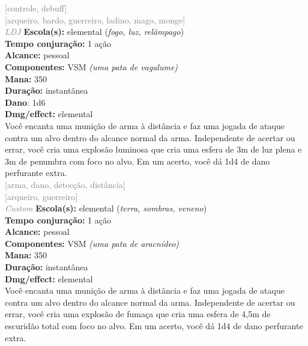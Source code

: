 \documentclass{RPG_Adventure}[2021/10/20]
\begin{document}
{\scriptsize \textcolor{gray}{[controle, debuff]\\}}
{\scriptsize \textcolor{gray}{[arqueiro, bardo, guerreiro, ladino, mago, monge]\\}}
{\tiny \textcolor{gray}{\textit{LDJ}}}
{\small \t \textbf{Escola(s):} elemental (\textit{fogo, luz, relâmpago})\\\t \textbf{Tempo conjuração:} 1 ação\\\t \textbf{Alcance:} pessoal\\\t \textbf{Componentes:} VSM \textit{(uma pata de vagalume)}\\\t \textbf{Mana:} 350\\\t \textbf{Duração:} instantânea\\\t \textbf{Dano}: 1d6\\\t \textbf{Dmg/effect:} elemental\\}
{\normalsize Você encanta uma munição de arma à distância e faz uma jogada de ataque contra um alvo dentro do alcance normal da arma. Independente de acertar ou errar, você cria uma explosão luminosa que cria uma esfera de 3m de luz plena e 3m de penumbra com foco no alvo. Em um acerto, você dá 1d4 de dano perfurante extra.\\}
{\scriptsize \textcolor{gray}{[arma, dano, detecção, distância]\\}}
{\scriptsize \textcolor{gray}{[arqueiro, guerreiro]\\}}
{\tiny \textcolor{gray}{\textit{Custom}}}
{\small \t \textbf{Escola(s):} elemental (\textit{terra, sombras, veneno})\\\t \textbf{Tempo conjuração:} 1 ação\\\t \textbf{Alcance:} pessoal\\\t \textbf{Componentes:} VSM \textit{(uma pata de aracnídeo)}\\\t \textbf{Mana:} 350\\\t \textbf{Duração:} instantânea\\\t \textbf{Dmg/effect:} elemental\\}
{\normalsize Você encanta uma munição de arma à distância e faz uma jogada de ataque contra um alvo dentro do alcance normal da arma. Independente de acertar ou errar, você cria uma explosão de fumaça que cria uma esfera de 4,5m de escuridão total com foco no alvo. Em um acerto, você dá 1d4 de dano perfurante extra.\\}
\end{document}
